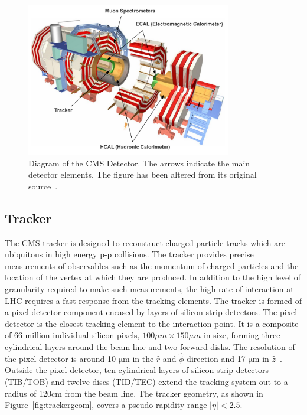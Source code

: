 \begin{figure}
\centering
	\includegraphics[width=0.8\textwidth]{detector/cmsdetector}
	\caption{Diagram of the CMS Detector. The arrows indicate the main detector elements. 
	The figure has been altered from its original source~\citep{cmspub}.}
	\label{fig:cms}
\end{figure}

\subsection{Tracker}
The CMS tracker is designed to reconstruct charged particle tracks 
which are ubiquitous in high energy 
p-p collisions. The tracker provides precise measurements of 
observables such as the momentum of charged particles and the location of the
vertex at which they are produced.
In addition to the high level of granularity required to make such measurements, the 
high rate of interaction at LHC requires a fast response from the tracking 
elements. 
The tracker is formed of a pixel detector component encased by layers of silicon strip detectors.
The pixel detector is the closest tracking element to the interaction point. 
It is a composite of 66 million individual silicon pixels, $100\mu m \times 150 \mu m$ in size,
forming three cylindrical layers around the beam line and two forward disks. 
The resolution of the pixel detector is around 10 $\mathrm{\mu}$m in the $\hat{r}$ and $\hat{\phi}$ 
direction and 17 $\mathrm{\mu}$m in $\hat{z}$~\citep{trckAC}. 
Outside the pixel detector, ten cylindrical layers of silicon strip detectors (TIB/TOB) 
and twelve discs (TID/TEC) extend the tracking system out to a radius of 120cm from the 
beam line. The tracker geometry, as shown in Figure~\ref{fig:trackergeom}, covers a pseudo-rapidity 
range $|\eta| < 2.5$.

